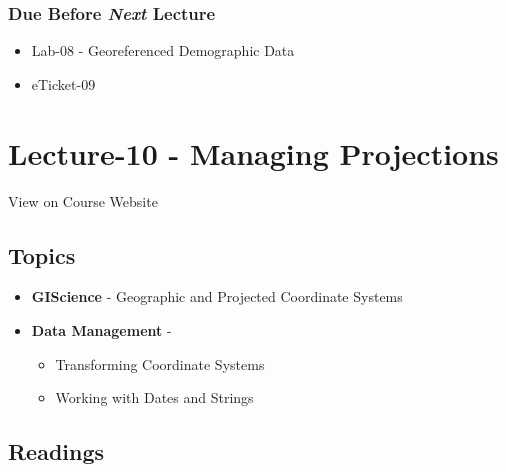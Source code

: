 \documentclass[]{book}
\providecommand{\tightlist}{%
  \setlength{\itemsep}{0pt}\setlength{\parskip}{0pt}}
\begin{document}
\hypertarget{due-before-next-lecture-7}{%
\subsubsection*{\texorpdfstring{Due Before \emph{Next} Lecture}{Due Before Next Lecture}}\label{due-before-next-lecture-7}}

\begin{itemize}
\tightlist
\item
  Lab-08 - Georeferenced Demographic Data
\item
  eTicket-09
\end{itemize}

\hypertarget{lecture-10---managing-projections}{%
\section*{Lecture-10 - Managing Projections}\label{lecture-10---managing-projections}}

View on Course Website

\hypertarget{topics-10}{%
\subsection*{Topics}\label{topics-10}}

\begin{itemize}
\tightlist
\item
  \textbf{GIScience} - Geographic and Projected Coordinate Systems
\item
  \textbf{Data Management} -

  \begin{itemize}
  \tightlist
  \item
    Transforming Coordinate Systems
  \item
    Working with Dates and Strings
  \end{itemize}
\end{itemize}

\hypertarget{readings-10}{%
\subsection*{Readings}\label{readings-10}}
\end{document}
